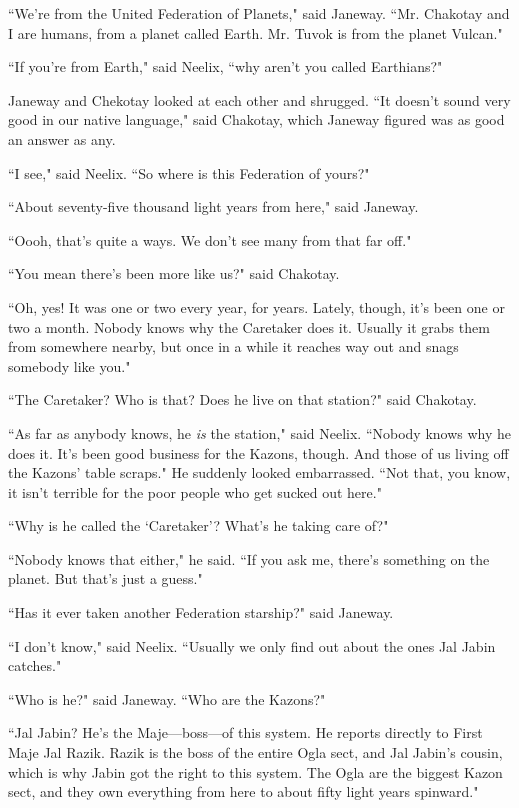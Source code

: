 \documentclass[twoside,letterpaper,12pt]{memoir}
\begin{document}
``We're from the United Federation of Planets," said Janeway. ``Mr. Chakotay and I are humans, from a planet called Earth. Mr. Tuvok is from the planet Vulcan."

``If you're from Earth," said Neelix, ``why aren't you called Earthians?"

Janeway and Chekotay looked at each other and shrugged. ``It doesn't sound very good in our native language," said Chakotay, which Janeway figured was as good an answer as any.

``I see," said Neelix. ``So where is this Federation of yours?"

``About seventy-five thousand light years from here," said Janeway.

``Oooh, that's quite a ways. We don't see many from that far off."

``You mean there's been more like us?" said Chakotay.

``Oh, yes! It was one or two every year, for years. Lately, though, it's been one or two a month. Nobody knows why the Caretaker does it. Usually it grabs them from somewhere nearby, but once in a while it reaches way out and snags somebody like you."

``The Caretaker? Who is that? Does he live on that station?" said Chakotay.

``As far as anybody knows, he \textit{is} the station," said Neelix. ``Nobody knows why he does it. It's been good business for the Kazons, though. And those of us living off the Kazons' table scraps." He suddenly looked embarrassed. ``Not that, you know, it isn't terrible for the poor people who get sucked out here."

``Why is he called the `Caretaker'? What's he taking care of?"

``Nobody knows that either," he said. ``If you ask me, there's something on the planet. But that's just a guess."

``Has it ever taken another Federation starship?" said Janeway.

``I don't know," said Neelix. ``Usually we only find out about the ones Jal Jabin catches."

``Who is he?" said Janeway. ``Who are the Kazons?"

``Jal Jabin? He's the Maje---boss---of this system. He reports directly to First Maje Jal Razik. Razik is the boss of the entire Ogla sect, and Jal Jabin’s cousin, which is why Jabin got the right to this system. The Ogla are the biggest Kazon sect, and they own everything from here to about fifty light years spinward."
\end{document}
